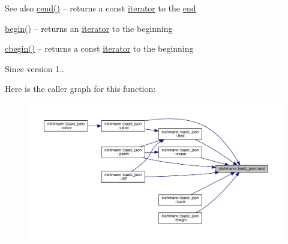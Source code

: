 \begin{DoxySeeAlso}{See also}
\mbox{\hyperlink{classnlohmann_1_1basic__json_a8dba7b7d2f38e6b0c614030aa43983f6}{cend()}} -- returns a const \mbox{\hyperlink{classnlohmann_1_1basic__json_a099316232c76c034030a38faa6e34dca}{iterator}} to the \mbox{\hyperlink{classnlohmann_1_1basic__json_a13e032a02a7fd8a93fdddc2fcbc4763c}{end}} 

\mbox{\hyperlink{classnlohmann_1_1basic__json_a0ff28dac23f2bdecee9564d07f51dcdc}{begin()}} -- returns an \mbox{\hyperlink{classnlohmann_1_1basic__json_a099316232c76c034030a38faa6e34dca}{iterator}} to the beginning 

\mbox{\hyperlink{classnlohmann_1_1basic__json_ad865d6c291b237ae508d5cb2146b5877}{cbegin()}} -- returns a const \mbox{\hyperlink{classnlohmann_1_1basic__json_a099316232c76c034030a38faa6e34dca}{iterator}} to the beginning
\end{DoxySeeAlso}
\begin{DoxySince}{Since}
version 1.. 
\end{DoxySince}
Here is the caller graph for this function\+:\nopagebreak
\begin{figure}[H]
\begin{center}
\leavevmode
\includegraphics[width=350pt]{classnlohmann_1_1basic__json_a13e032a02a7fd8a93fdddc2fcbc4763c_icgraph}
\end{center}
\end{figure}
\mbox{\label{classnlohmann_1_1basic__json_a1c15707055088cd5436ae91db72cbe67}} 
